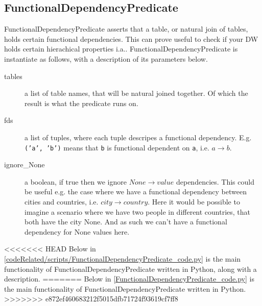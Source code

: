 \subsection{FunctionalDependencyPredicate}
FunctionalDependencyPredicate asserts that a table, or natural join of tables, holds certain functional dependencies. This can prove useful to check if your DW holds certain hierachical properties i.a.. FunctionalDependencyPredicate is instantiate as follows, with a description of its parameters below.


\begin{description}
\item [tables] a list of table names, that will be natural joined together. Of which the result is what the predicate runs on. 
\item [fds] a list of tuples, where each tuple descripes a functional dependency. E.g. \texttt{('a', 'b')} means that \texttt{b} is functional dependent on \texttt{a}, i.e. $a \rightarrow b$.
\item [ignore\_None] a boolean, if true then we ignore $None \rightarrow value$ dependencies. This could be useful e.g. the case where we have a functional dependency between cities and countries, i.e. $city \rightarrow country$. Here it would be possible to imagine a scenario where we have two people in different countries, that both have the city None. And as such we can't have a functional dependency for None values here.
  
\end{description}

<<<<<<< HEAD
Below in \cref{codeRelated/scripts/FunctionalDependencyPredicate_code.py} is the main functionality of FunctionalDependencyPredicate written in Python, along with a description. 
=======
Below in \cref{FunctionalDependencyPredicate_code.py} is the main functionality of FunctionalDependencyPredicate written in Python.
>>>>>>> e872ef460683212f5015dfb71724f93619cf7ff8


